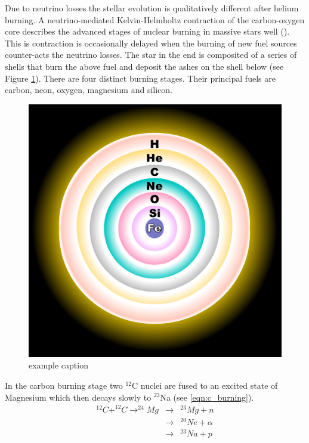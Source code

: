 Due to neutrino losses the stellar evolution is qualitatively different after helium burning. A neutrino-mediated Kelvin-Helmholtz contraction of the carbon-oxygen core describes the advanced stages of nuclear burning in massive stars well (\citet{2002RvMP...74.1015W}). This is contraction is occasionally delayed when the burning of new fuel sources counter-acts the neutrino losses. The star in the end is composited of a series of shells that burn the above fuel and deposit the ashes on the shell below (see Figure \ref{fig:fusion_shells}). There are four distinct burning stages. Their principal fuels are carbon, neon, oxygen, magnesium and silicon.

\begin{figure}[htbp] %
   \centering
   \includegraphics[width=\textwidth]{chapter1/plots/fusion_shells.pdf} 
   \caption{example caption}
   \label{fig:fusion_shells}
\end{figure}


In the carbon burning stage two $^{12}$C nuclei are fused to an excited state of Magnesium which then decays slowly to $^{23}$Na (see \ref{eqn:c_burning}).
\begin{eqnarray}
^{12}C+^{12}C\rightarrow^{24}Mg&\rightarrow&^{23}Mg+n \nonumber \\
	&\rightarrow&^{20}Ne + \alpha \nonumber \\
	&\rightarrow&^{23}Na +p \nonumber \\
	\label{eqn:c_burning}
\end{eqnarray}

